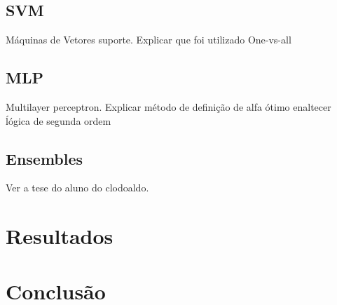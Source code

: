 \documentclass[conference]{IEEEtran}
\begin{document}
\subsection{SVM}
Máquinas de Vetores suporte.
Explicar que foi utilizado One-vs-all


\subsection{MLP}
Multilayer perceptron.
Explicar método de definição de alfa ótimo
enaltecer ĺógica de segunda ordem

\subsection{Ensembles}
Ver a tese do aluno do clodoaldo.

\section{Resultados}

\section{Conclusão}






\end{document}
